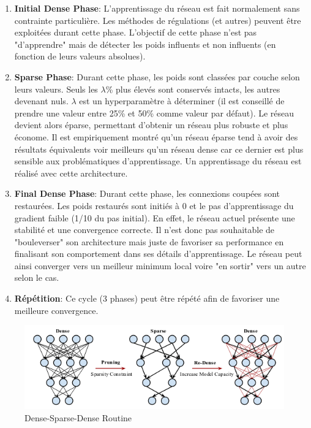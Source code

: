 \begin{enumerate}
    \item \textbf{Initial Dense Phase}: L'apprentissage du réseau est fait normalement sans contrainte particulière. Les méthodes de régulations (et autres) peuvent être exploitées durant cette phase. L'objectif de cette phase n'est pas "d'apprendre" mais de détecter les poids influents et non influents (en fonction de leurs valeurs absolues).

    \item \textbf{Sparse Phase}: Durant cette phase, les poids sont classées par couche selon leurs valeurs. Seuls les $\lambda$\% plus élevés sont conservés intacts, les autres devenant nuls. $\lambda$ est un hyperparamètre à déterminer (il est conseillé de prendre une valeur entre 25\% et 50\% comme valeur par défaut). Le réseau devient alors éparse, permettant d'obtenir un réseau plus robuste et plus économe. Il est empiriquement montré qu'un réseau éparse tend à avoir des résultats équivalents voir meilleurs qu'un réseau dense car ce dernier est plus sensible aux problématiques d'apprentissage. Un apprentissage du réseau est réalisé avec cette architecture.

    \item  \textbf{Final Dense Phase}: Durant cette phase, les connexions coupées sont restaurées. Les poids restaurés sont initiés à 0 et le pas d'apprentissage du gradient faible (1/10 du pas initial). En effet, le réseau actuel présente une stabilité et une convergence correcte. Il n'est donc pas souhaitable de "bouleverser" son architecture mais juste de favoriser sa performance en finalisant son comportement dans ses détails d'apprentissage. Le réseau peut ainsi converger vers un meilleur minimum local voire "en sortir" vers un autre selon le cas.

    \item \textbf{Répétition}: Ce cycle (3 phases) peut être répété afin de favoriser une meilleure convergence.
\end{enumerate}

\begin{figure}
    \centering
    \includegraphics[scale=0.4]{./tex/regularisation/dsd.png}
    \caption{Dense-Sparse-Dense Routine}
    \label{dsd_fig}
\end{figure}

